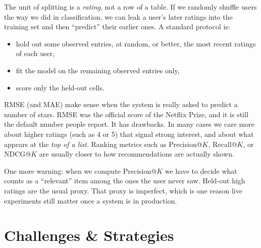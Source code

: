 \documentclass[
]{book}
\providecommand{\tightlist}{%
  \setlength{\itemsep}{0pt}\setlength{\parskip}{0pt}}
\begin{document}
The unit of splitting is a \emph{rating}, not a row of a table. If we randomly shuffle users the way we did in classification, we can leak a user's later ratings into the training set and then ``predict'' their earlier ones. A standard protocol is:

\begin{itemize}
\tightlist
\item
  hold out some observed entries, at random, or better, the most recent ratings of each user,
\item
  fit the model on the remaining observed entries only,
\item
  score only the held-out cells.
\end{itemize}

RMSE (and MAE) make sense when the system is really asked to predict a number of stars. RMSE was the official score of the Netflix Prize, and it is still the default number people report. It has drawbacks. In many cases we care more about higher ratings (such as 4 or 5) that signal strong interest, and about what appears at the \emph{top of a list}. Ranking metrics such as Precision@\(K\), Recall@\(K\), or NDCG@\(K\) are usually closer to how recommendations are actually shown.

One more warning: when we compute Precision@\(K\) we have to decide what counts as a ``relevant'' item among the ones the user never saw. Held-out high ratings are the usual proxy. That proxy is imperfect, which is one reason live experiments still matter once a system is in production.

\section{Challenges \& Strategies}\label{challenges-strategies}
\end{document}
